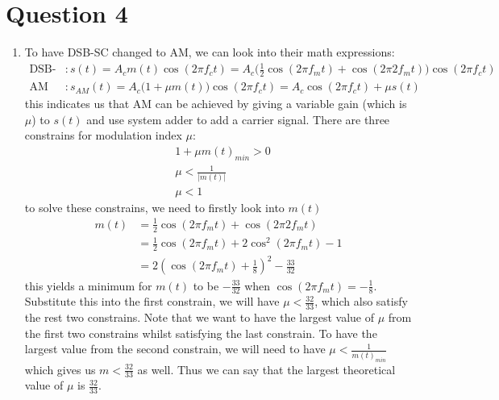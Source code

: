 \documentclass[11pt]{article}
\begin{document}
\section*{Question 4}
\begin{enumerate}[label=(\alph*)]
\item %
To have DSB-SC changed to AM, we can look into their math expressions: 
\begin{align*}
\text{DSB-SC}&: s(t) = A_c m(t)\cos(2\pi f_c t) = A_c\biggr( \frac{1}{2} \cos(2 \pi f_m t)+\cos(2\pi 2 f_m t)\biggr ) \cos(2\pi f_c t)\\
\text{AM}&: s_{AM}(t) = A_c \biggr(1+\mu m(t) \biggr)\cos(2\pi f_c t) = A_c \cos(2\pi f_c t)+\mu s(t)
\end{align*}
this indicates us that AM can be achieved by giving a variable gain (which is $\mu$) to $s(t)$ and use system adder to add a carrier signal. There are three constrains for modulation index $\mu$:
\begin{align*}
 & 1+\mu m(t)_{min}>0\\
 & \mu<\frac{1}{|m(t)|}\\
 & \mu<1
\end{align*}
to solve these constrains, we need to firstly look into $m(t)$
\begin{align*}
 m(t)&=\frac{1}{2} \cos(2 \pi f_m t)+\cos(2\pi 2 f_m t) \\
 &= \frac{1}{2} \cos(2 \pi f_m t)+2\cos^2(2\pi f_m t)-1\\
 &=2(\cos(2\pi f_m t)+\frac{1}{8})^2-\frac{33}{32}
\end{align*}
this yields a minimum for $m(t)$ to be $-\frac{33}{32}$ when $\cos(2\pi f_m t)=-\frac{1}{8}$. Substitute this into the first constrain, we will have $\mu<\frac{32}{33}$, which also satisfy the rest two constrains. Note that we want to have the largest value of $\mu$ from the first two constrains whilst satisfying the last constrain. To have the largest value from the second constrain, we will need to have $\mu<\frac{1}{m(t)_{min}}$ which gives us $m<\frac{32}{33}$ as well. Thus we can say that the largest theoretical value of $\mu$ is $\frac{32}{33}$.


\end{enumerate}
\end{document}
